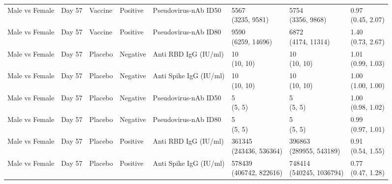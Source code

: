 \documentclass[]{book}
\theoremstyle{definition}
\theoremstyle{definition}
\theoremstyle{definition}
\newcommand{\1}{\mathbbm{1}}
\begin{document}
\begin{landscape}
\begin{ThreePartTable}
\begin{longtable}[t]{>{\raggedright\arraybackslash}p{2.7cm}lllllll}
\addlinespace
Male vs Female & Day 57 & Vaccine & Positive & Pseudovirus-nAb ID50 & \makecell[l]{5567\\(3235, 9581)} & \makecell[l]{5754\\(3356, 9868)} & \makecell[l]{0.97\\(0.45, 2.07)}\\
Male vs Female & Day 57 & Vaccine & Positive & Pseudovirus-nAb ID80 & \makecell[l]{9590\\(6259, 14696)} & \makecell[l]{6872\\(4174, 11314)} & \makecell[l]{1.40\\(0.73, 2.67)}\\
Male vs Female & Day 57 & Placebo & Negative & Anti RBD IgG (IU/ml) & \makecell[l]{10\\(10, 10)} & \makecell[l]{10\\(10, 10)} & \makecell[l]{1.01\\(0.99, 1.03)}\\
Male vs Female & Day 57 & Placebo & Negative & Anti Spike IgG (IU/ml) & \makecell[l]{10\\(10, 10)} & \makecell[l]{10\\(10, 10)} & \makecell[l]{1.00\\(1.00, 1.00)}\\
Male vs Female & Day 57 & Placebo & Negative & Pseudovirus-nAb ID50 & \makecell[l]{5\\(5, 5)} & \makecell[l]{5\\(5, 5)} & \makecell[l]{1.00\\(0.98, 1.02)}\\
\addlinespace
Male vs Female & Day 57 & Placebo & Negative & Pseudovirus-nAb ID80 & \makecell[l]{5\\(5, 5)} & \makecell[l]{5\\(5, 5)} & \makecell[l]{0.99\\(0.97, 1.01)}\\
Male vs Female & Day 57 & Placebo & Positive & Anti RBD IgG (IU/ml) & \makecell[l]{361345\\(243436, 536364)} & \makecell[l]{396863\\(289955, 543189)} & \makecell[l]{0.91\\(0.54, 1.55)}\\
Male vs Female & Day 57 & Placebo & Positive & Anti Spike IgG (IU/ml) & \makecell[l]{578439\\(406742, 822616)} & \makecell[l]{748414\\(540245, 1036794)} & \makecell[l]{0.77\\(0.47, 1.28)}\\

\end{longtable}
\end{ThreePartTable}
\end{landscape}
\end{document}
